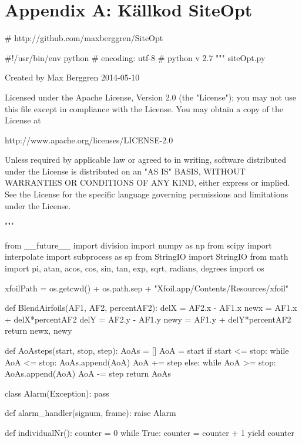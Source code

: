 \chapter{Appendix A: Källkod SiteOpt} \label{Chapter:kallkod}


\begin{pythoncode}
# http://github.com/maxberggren/SiteOpt

#!/usr/bin/env python
# encoding: utf-8
# python v 2.7
"""
siteOpt.py

Created by Max Berggren 2014-05-10

Licensed under the Apache License, Version 2.0 (the "License");
you may not use this file except in compliance with the License.
You may obtain a copy of the License at

   http://www.apache.org/licenses/LICENSE-2.0

Unless required by applicable law or agreed to in writing, software
distributed under the License is distributed on an "AS IS" BASIS,
WITHOUT WARRANTIES OR CONDITIONS OF ANY KIND, either express or implied.
See the License for the specific language governing permissions and
limitations under the License.

"""

from __future__ import division
import numpy as np
from scipy import interpolate
import subprocess as sp
from StringIO import StringIO
from math import pi, atan, acos, cos, sin, tan, exp, sqrt, radians, degrees
import os

xfoilPath = os.getcwd() + os.path.sep + "Xfoil.app/Contents/Resources/xfoil"


def BlendAirfoils(AF1, AF2, percentAF2):
    delX = AF2.x - AF1.x
    newx = AF1.x + delX*percentAF2
    delY = AF2.y - AF1.y
    newy = AF1.y + delY*percentAF2
    return newx, newy

def AoAsteps(start, stop, step):
    AoAs = []
    AoA = start
    if start <= stop:
        while AoA <= stop:
            AoAs.append(AoA)
            AoA += step
    else:
        while AoA >= stop:
            AoAs.append(AoA)
            AoA -= step
    return AoAs

class Alarm(Exception):
    pass

def alarm_handler(signum, frame):
    raise Alarm


def individualNr():
    counter = 0  
    while True:
        counter = counter + 1
        yield counter


\end{pythoncode}
